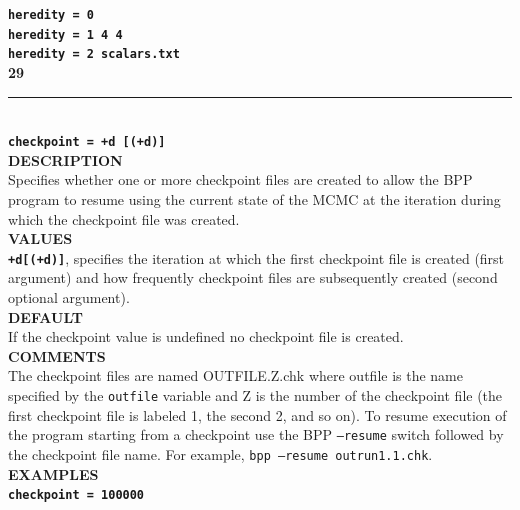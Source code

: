 \documentclass{book}
\numberwithin{equation}{section} \renewcommand{\baselinestretch}{0.55}
\begin{document}
\textbf{\texttt{heredity = 0}} \vspace{5pt}\\
\textbf{\texttt{heredity = 1 4 4}}\vspace{5pt}\\
\textbf{\texttt{heredity = 2 scalars.txt}} \vspace{10pt}\\
\textbf{{\large 29}} \\
\noindent\rule{\textwidth}{0.8pt} \\
\textbf{{\Large \texttt{checkpoint = +d [(+d)]}}} \vspace{5pt}\\
\textbf{DESCRIPTION} \vspace{5pt}\\
Specifies whether one or more checkpoint files are created to allow
the BPP program to resume using the current state of the MCMC at the
iteration during which the checkpoint file was created.
\vspace{5pt}\\
\textbf{VALUES} \vspace{5pt}\\
\textbf{\texttt{+d[(+d)]}}, specifies the iteration at which the first
checkpoint file is created (first argument) and how frequently
checkpoint files are subsequently created (second optional argument).
\vspace{5pt}\\
\textbf{DEFAULT} \vspace{5pt}\\
If the checkpoint value is undefined no checkpoint file is created.
\vspace{5pt}\\
\textbf{COMMENTS} \vspace{5pt}\\
The checkpoint files are named OUTFILE.Z.chk where outfile is the name
specified by the \texttt{outfile} variable and Z is the number of the
checkpoint file (the first checkpoint file is labeled 1, the second 2,
and so on). To resume execution of the program starting from a
checkpoint use the BPP \texttt{--resume} switch followed by the
checkpoint file name.  For example, \texttt{bpp --resume
  outrun1.1.chk}.
\vspace{5pt}\\
\textbf{EXAMPLES} \vspace{5pt}\\
\textbf{\texttt{checkpoint = 100000}} \vspace{5pt}\\
\end{document}
